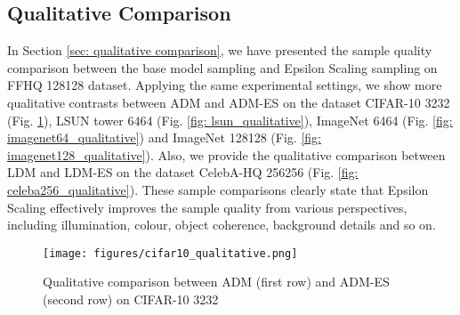 \documentclass{article} \usepackage{iclr2024_conference,times}
\begin{document}
\begin{figure*}[ht]
\centering
\caption{Left: Epsilon Scaling achieves a smaller  at the end of sampling (). Right: after applying Epsilon Scaling, the sampling  (blue) gets closer to the training  (red).} 
\label{fig: ffhq128 exposure bias}
\end{figure*}




\subsection{Qualitative Comparison}
\label{Append: qualitative}

In Section \ref{sec: qualitative comparison}, we have presented the sample quality comparison between the base model sampling and Epsilon Scaling sampling on FFHQ 128128 dataset. Applying the same experimental settings, we show more qualitative contrasts between ADM and ADM-ES on the dataset CIFAR-10 3232 (Fig. \ref{fig: cifar10_qualitative}), LSUN tower 6464 (Fig. \ref{fig: lsun_qualitative}), ImageNet 6464 (Fig. \ref{fig: imagenet64_qualitative}) and ImageNet 128128 (Fig. \ref{fig: imagenet128_qualitative}). Also, we provide the qualitative comparison between LDM and LDM-ES on the dataset CelebA-HQ 256256 (Fig. \ref{fig: celeba256_qualitative}). These sample comparisons clearly state that Epsilon Scaling effectively improves the sample quality from various perspectives, including illumination, colour, object coherence, background details and so on.


\begin{figure}[ht]
\vskip 0.0in
\begin{center}
\centerline{\texttt{[image: figures/cifar10\_qualitative.png]}}
\caption{Qualitative comparison between ADM (first row) and ADM-ES (second row) on CIFAR-10 3232 
}
\label{fig: cifar10_qualitative}
\end{center}
\vskip -0.2in
\end{figure}
\end{document}
